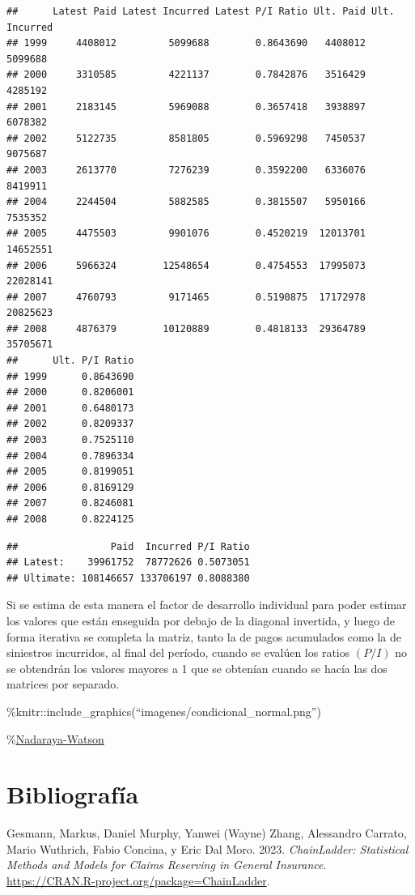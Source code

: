 \documentclass[
  12pt,
]{article}
\newlength{\cslhangindent}
\newlength{\cslentryspacingunit} %
\newenvironment{CSLReferences}[2] %
 {%
  \setlength{\parindent}{0pt}
  \ifodd #1
  \let\oldpar\par
  \def\par{\hangindent=\cslhangindent\oldpar}
  \fi
  \setlength{\parskip}{#2\cslentryspacingunit}
 }%
 {}
\begin{document}
\begin{verbatim}
##      Latest Paid Latest Incurred Latest P/I Ratio Ult. Paid Ult. Incurred
## 1999     4408012         5099688        0.8643690   4408012       5099688
## 2000     3310585         4221137        0.7842876   3516429       4285192
## 2001     2183145         5969088        0.3657418   3938897       6078382
## 2002     5122735         8581805        0.5969298   7450537       9075687
## 2003     2613770         7276239        0.3592200   6336076       8419911
## 2004     2244504         5882585        0.3815507   5950166       7535352
## 2005     4475503         9901076        0.4520219  12013701      14652551
## 2006     5966324        12548654        0.4754553  17995073      22028141
## 2007     4760793         9171465        0.5190875  17172978      20825623
## 2008     4876379        10120889        0.4818133  29364789      35705671
##      Ult. P/I Ratio
## 1999      0.8643690
## 2000      0.8206001
## 2001      0.6480173
## 2002      0.8209337
## 2003      0.7525110
## 2004      0.7896334
## 2005      0.8199051
## 2006      0.8169129
## 2007      0.8246081
## 2008      0.8224125
\end{verbatim}

\begin{verbatim}
##                Paid  Incurred P/I Ratio
## Latest:    39961752  78772626 0.5073051
## Ultimate: 108146657 133706197 0.8088380
\end{verbatim}

Si se estima de esta manera el factor de desarrollo individual para
poder estimar los valores que están enseguida por debajo de la diagonal
invertida, y luego de forma iterativa se completa la matriz, tanto la de
pagos acumulados como la de siniestros incurridos, al final del período,
cuando se evalúen los ratios \((P/I)\) no se obtendrán los valores
mayores a 1 que se obtenían cuando se hacía las dos matrices por
separado.

\%knitr::include\_graphics(``imagenes/condicional\_normal.png'')

\%\protect\hyperlink{bib}{Nadaraya-Watson}

\newpage

\hypertarget{bib}{%
\section*{Bibliografía}\label{bib}}

\hypertarget{refs}{}
\begin{CSLReferences}{1}{0}
\leavevmode{}%
Gesmann, Markus, Daniel Murphy, Yanwei (Wayne) Zhang, Alessandro
Carrato, Mario Wuthrich, Fabio Concina, y Eric Dal Moro. 2023.
\emph{ChainLadder: Statistical Methods and Models for Claims Reserving
in General Insurance}.
\url{https://CRAN.R-project.org/package=ChainLadder}.

\end{CSLReferences}
\end{document}
